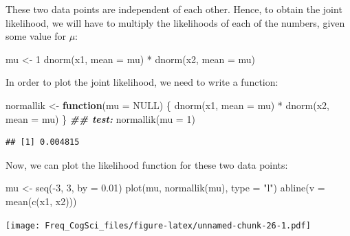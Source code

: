 \documentclass[
  12pt,
]{krantz}
\newenvironment{Shaded}{\begin{snugshade}}{\end{snugshade}}
\newcommand{\AttributeTok}[1]{\textcolor[rgb]{0.77,0.63,0.00}{#1}}
\newcommand{\ConstantTok}[1]{\textcolor[rgb]{0.00,0.00,0.00}{#1}}
\newcommand{\ControlFlowTok}[1]{\textcolor[rgb]{0.13,0.29,0.53}{\textbf{#1}}}
\newcommand{\DecValTok}[1]{\textcolor[rgb]{0.00,0.00,0.81}{#1}}
\newcommand{\DocumentationTok}[1]{\textcolor[rgb]{0.56,0.35,0.01}{\textbf{\textit{#1}}}}
\newcommand{\FloatTok}[1]{\textcolor[rgb]{0.00,0.00,0.81}{#1}}
\newcommand{\FunctionTok}[1]{\textcolor[rgb]{0.00,0.00,0.00}{#1}}
\newcommand{\NormalTok}[1]{#1}
\newcommand{\OtherTok}[1]{\textcolor[rgb]{0.56,0.35,0.01}{#1}}
\newcommand{\SpecialCharTok}[1]{\textcolor[rgb]{0.00,0.00,0.00}{#1}}
\newcommand{\StringTok}[1]{\textcolor[rgb]{0.31,0.60,0.02}{#1}}
\theoremstyle{definition}
\theoremstyle{definition}
\theoremstyle{definition}
\theoremstyle{definition}
\theoremstyle{remark}
\begin{document}
These two data points are independent of each other. Hence, to obtain the joint likelihood, we will have to multiply the likelihoods of each of the numbers, given some value for \(\mu\):

\begin{Shaded}
\begin{Highlighting}[]
\NormalTok{mu }\OtherTok{\textless{}{-}} \DecValTok{1}
\FunctionTok{dnorm}\NormalTok{(x1, }\AttributeTok{mean =}\NormalTok{ mu) }\SpecialCharTok{*} \FunctionTok{dnorm}\NormalTok{(x2, }\AttributeTok{mean =}\NormalTok{ mu)}
\end{Highlighting}
\end{Shaded}

In order to plot the joint likelihood, we need to write a function:

\begin{Shaded}
\begin{Highlighting}[]
\NormalTok{normallik }\OtherTok{\textless{}{-}} \ControlFlowTok{function}\NormalTok{(}\AttributeTok{mu =} \ConstantTok{NULL}\NormalTok{) \{}
  \FunctionTok{dnorm}\NormalTok{(x1, }\AttributeTok{mean =}\NormalTok{ mu) }\SpecialCharTok{*} \FunctionTok{dnorm}\NormalTok{(x2, }\AttributeTok{mean =}\NormalTok{ mu)}
\NormalTok{\}}
\DocumentationTok{\#\# test:}
\FunctionTok{normallik}\NormalTok{(}\AttributeTok{mu =} \DecValTok{1}\NormalTok{)}
\end{Highlighting}
\end{Shaded}

\begin{verbatim}
## [1] 0.004815
\end{verbatim}

Now, we can plot the likelihood function for these two data points:

\begin{Shaded}
\begin{Highlighting}[]
\NormalTok{mu }\OtherTok{\textless{}{-}} \FunctionTok{seq}\NormalTok{(}\SpecialCharTok{{-}}\DecValTok{3}\NormalTok{, }\DecValTok{3}\NormalTok{, }\AttributeTok{by =} \FloatTok{0.01}\NormalTok{)}
\FunctionTok{plot}\NormalTok{(mu, }\FunctionTok{normallik}\NormalTok{(mu), }\AttributeTok{type =} \StringTok{"l"}\NormalTok{)}
\FunctionTok{abline}\NormalTok{(}\AttributeTok{v =} \FunctionTok{mean}\NormalTok{(}\FunctionTok{c}\NormalTok{(x1, x2)))}
\end{Highlighting}
\end{Shaded}

\texttt{[image: Freq\_CogSci\_files/figure-latex/unnamed-chunk-26-1.pdf]}
\end{document}
